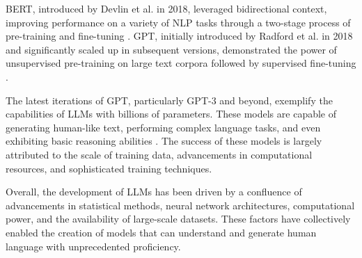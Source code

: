 BERT, introduced by Devlin et al. in 2018, leveraged bidirectional context, improving performance on a variety of NLP tasks through a two-stage process of pre-training and fine-tuning \cite{devlin2018bert}. GPT, initially introduced by Radford et al. in 2018 and significantly scaled up in subsequent versions, demonstrated the power of unsupervised pre-training on large text corpora followed by supervised fine-tuning \cite{Radford2018ImprovingLU}.

The latest iterations of GPT, particularly GPT-3 and beyond, exemplify the capabilities of LLMs with billions of parameters. These models are capable of generating human-like text, performing complex language tasks, and even exhibiting basic reasoning abilities \cite{brown2020language}. The success of these models is largely attributed to the scale of training data, advancements in computational resources, and sophisticated training techniques.

Overall, the development of LLMs has been driven by a confluence of advancements in statistical methods, neural network architectures, computational power, and the availability of large-scale datasets. These factors have collectively enabled the creation of models that can understand and generate human language with unprecedented proficiency.

\newpage